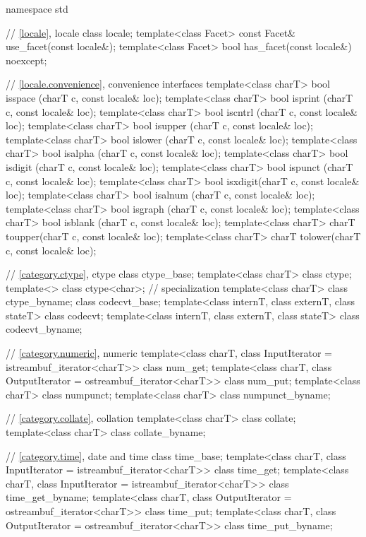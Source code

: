 %
\begin{codeblock}
namespace std {
  // \ref{locale}, locale
  class locale;
  template<class Facet> const Facet& use_facet(const locale&);
  template<class Facet> bool         has_facet(const locale&) noexcept;

  // \ref{locale.convenience}, convenience interfaces
  template<class charT> bool isspace (charT c, const locale& loc);
  template<class charT> bool isprint (charT c, const locale& loc);
  template<class charT> bool iscntrl (charT c, const locale& loc);
  template<class charT> bool isupper (charT c, const locale& loc);
  template<class charT> bool islower (charT c, const locale& loc);
  template<class charT> bool isalpha (charT c, const locale& loc);
  template<class charT> bool isdigit (charT c, const locale& loc);
  template<class charT> bool ispunct (charT c, const locale& loc);
  template<class charT> bool isxdigit(charT c, const locale& loc);
  template<class charT> bool isalnum (charT c, const locale& loc);
  template<class charT> bool isgraph (charT c, const locale& loc);
  template<class charT> bool isblank (charT c, const locale& loc);
  template<class charT> charT toupper(charT c, const locale& loc);
  template<class charT> charT tolower(charT c, const locale& loc);

  // \ref{category.ctype}, ctype
  class ctype_base;
  template<class charT> class ctype;
  template<>            class ctype<char>;     // specialization
  template<class charT> class ctype_byname;
  class codecvt_base;
  template<class internT, class externT, class stateT> class codecvt;
  template<class internT, class externT, class stateT> class codecvt_byname;

  // \ref{category.numeric}, numeric
  template<class charT, class InputIterator = istreambuf_iterator<charT>>
    class num_get;
  template<class charT, class OutputIterator = ostreambuf_iterator<charT>>
    class num_put;
  template<class charT>
    class numpunct;
  template<class charT>
    class numpunct_byname;

  // \ref{category.collate}, collation
  template<class charT> class collate;
  template<class charT> class collate_byname;

  // \ref{category.time}, date and time
  class time_base;
  template<class charT, class InputIterator = istreambuf_iterator<charT>>
    class time_get;
  template<class charT, class InputIterator = istreambuf_iterator<charT>>
    class time_get_byname;
  template<class charT, class OutputIterator = ostreambuf_iterator<charT>>
    class time_put;
  template<class charT, class OutputIterator = ostreambuf_iterator<charT>>
    class time_put_byname;

}
\end{codeblock}
